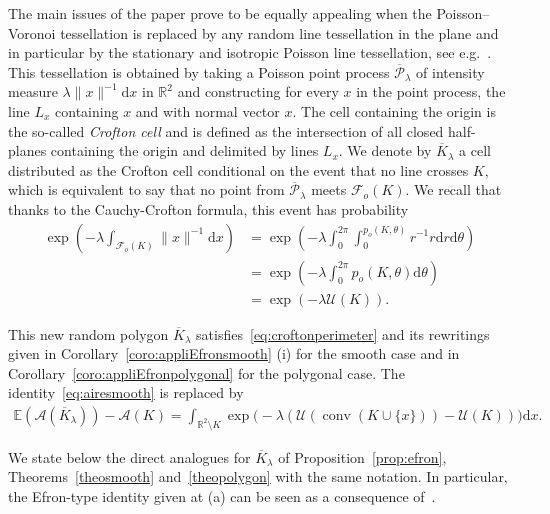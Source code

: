 \documentclass[10pt]{amsart}
\theoremstyle{definition}\newtheorem{defi}[theo]{Definition}\newtheorem{rema}[theo]{Remark}\newtheorem{exam}[theo]{Example}\newtheorem{exem}[theo]{Example}\newtheorem{nota}[theo]{Notation}
\DeclareMathOperator{\conv}{conv}
\newcommand{\cA}{\mathcal{A}}
\newcommand{\cF}{\mathcal{F}}
\newcommand{\cP}{\mathcal{P}}
\newcommand{\cU}{\mathcal{U}}
\newcommand{\dd}{\mathrm{d}}
\newcommand{\E}{\mathbb{E}}
\newcommand{\R}{\mathbb{R}}
\newcommand{\noi}{\noindent}
\begin{document}
The main issues of the paper prove to be equally appealing when the Poisson--Voronoi tessellation is replaced by any random line tessellation in the plane and in particular by the stationary and isotropic Poisson line tessellation, see e.g.~\cite[Section~10.3]{SW}. This tessellation is obtained by taking a Poisson point process $\overline{\cP}_\lambda$ of intensity measure $\lambda \|x\|^{-1}\dd x$ in $\R^2$ and constructing for every $x$ in the point process, the line $L_{x}$ containing $x$ and with normal vector $x$. The cell containing the origin is the so-called \emph{Crofton cell} and is defined as the intersection of all closed half-planes containing the origin and delimited by lines $L_{x}$. We denote by $\overline{K}_\lambda$ a cell distributed as the Crofton cell conditional on the event that no line crosses $K$, which is equivalent to say that no point from $\overline{\cP}_\lambda$ meets $\cF_o(K)$. We recall that thanks to the Cauchy-Crofton formula, this event has probability
\begin{align}
\exp\left(-\lambda\int_{\cF_o(K)}\|x\|^{-1}\dd x\right)&=\exp\left(-\lambda\int_{0}^{2\pi}\int_0^{p_o(K,\theta)}r^{-1}r\dd r \dd \theta\right)\nonumber\\
&=\exp\left(-\lambda\int_{0}^{2\pi}p_o(K,\theta)\dd \theta\right)\nonumber
\\
&=\exp(-\lambda\cU(K)).\label{eq:probavidecrofton}
\end{align}


This new random polygon $\overline{K}_{\lambda}$ satisfies~\eqref{eq:croftonperimeter} and its rewritings given in Corollary~\ref{coro:appliEfronsmooth} (i) for the smooth case and in Corollary~\ref{coro:appliEfronpolygonal} for the polygonal case. The identity~\eqref{eq:airesmooth} is replaced by
\begin{align}\label{eq:defectareacrofton}
\E(\cA(\overline{K}_\lambda))-\cA(K) =\int_{\R^2\setminus K} \exp\Big(-\lambda (\cU(\conv(K\cup\{x\}))-\cU(K))\Big)\dd x.
\end{align}

We state below the direct analogues for $\overline{K}_\lambda$ of Proposition~\ref{prop:efron}, Theorems~\ref{theosmooth} and~\ref{theopolygon} with the same notation. In particular, the Efron-type identity given at (a) can be seen as a consequence of~\cite[penultimate display on page 693]{Sch09}.
\end{document}
